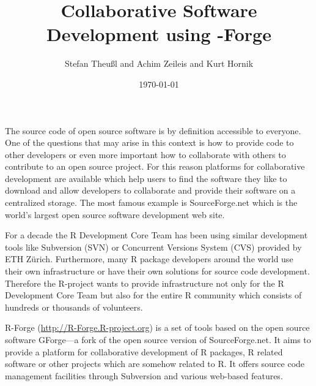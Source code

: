\documentclass[12pt,a4paper]{article}
\title{Collaborative Software Development using \proglang{R}-Forge}
\author{Stefan Theu\ss{}l and Achim Zeileis and Kurt Hornik}
\date{\today}
\newcommand{\proglang}[1]{\textsf{#1}}
\begin{document}
\maketitle



The source code of open source software is by definition accessible to
everyone. One of the questions that may arise 
in this context is how to provide code to other developers
or even
more important how to collaborate with others to contribute to an open
source project. For this reason platforms for collaborative
development are available which
help users to find the software they like to download and allow developers to
collaborate and provide their software on a centralized storage. The
most famous example is SourceForge.net which is the world's largest
open source software development web site.

For a decade the \proglang{R} Development Core Team has been using similar
development tools like Subversion (SVN) or Concurrent Versions System
(CVS) provided by ETH Z\"urich.  
Furthermore, many \proglang{R} package developers around the world use their own
infrastructure or have their own solutions for source code
development. Therefore the \proglang{R}-project
wants to provide infrastructure not only
for the \proglang{R} Development Core Team but also for the entire \proglang{R} community
which consists of hundreds or thousands of volunteers. 



\proglang{R}-Forge (\url{http://R-Forge.R-project.org}) is a set of tools based
on the open source software GForge---a fork of
the open source version
of SourceForge.net. 
It aims to provide a platform for collaborative development of
\proglang{R} packages, \proglang{R} 
related software or other projects which are somehow related to \proglang{R}.
It offers source code management facilities
through Subversion and various web-based features. 
\end{document}
